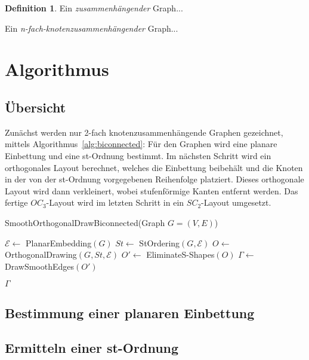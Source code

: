 \documentclass[a4paper]{scrreprt}
\theoremstyle{definition}
\newtheorem{definition}[satz]{Definition}
\newcommand{\Epsilon}{\mathcal{E}}
\begin{document}
\begin{definition}
  Ein \emph{zusammenhängender} Graph...

  Ein \emph{n-fach-knotenzusammenhängender} Graph...
\end{definition}






\chapter{Algorithmus}

\section{Übersicht}

Zunächst werden nur 2-fach knotenzusammenhängende Graphen gezeichnet, mittels Algorithmus~\ref{alg:biconnected}: Für den Graphen wird eine planare Einbettung und eine st-Ordnung bestimmt. Im nächsten Schritt wird ein orthogonales Layout berechnet, welches die Einbettung beibehält und die Knoten in der von der st-Ordnung vorgegebenen Reihenfolge platziert. Dieses orthogonale Layout wird dann verkleinert, wobei stufenförmige Kanten entfernt werden. Das fertige $OC_3$-Layout wird im letzten Schritt in ein $SC_2$-Layout umgesetzt.

\begin{algorithm}[ht]
  \caption{SmoothOrthogonalDrawBiconnected(Graph $G = (V,E)$)}
  \label{alg:biconnected}
  
  $\Epsilon \leftarrow$ PlanarEmbedding$(G)$ \;
  $St \leftarrow$ StOrdering$(G, \Epsilon)$ \;
  $O \leftarrow$ OrthogonalDrawing$(G,St,\Epsilon)$ \;
  $O' \leftarrow$ EliminateS-Shapes$(O)$ \;
  $\Gamma \leftarrow$ DrawSmoothEdges$(O')$ \;
  
  \Return $\Gamma$
\end{algorithm}


\section{Bestimmung einer planaren Einbettung}


\section{Ermitteln einer st-Ordnung}
\end{document}

